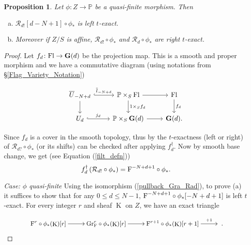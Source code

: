 \documentclass[12pt, reqno]{amsart}
\theoremstyle{plain}
\newtheorem{prop}[thm]{\bf Proposition}
\theoremstyle{definition}
\theoremstyle{definition}
\newcommand{\bbP}{{\mathbb P}}
\newcommand{\bG}{{\bf G}}
\newcommand{\cR}{{\mathcal R}}
\DeclareMathOperator{\KK}{K}
\begin{document}
\begin{prop}\label{Grass_Rad_Corollary}
    Let $\phi \colon Z \to \bbP$ be a quasi-finite morphism. Then 
    \begin{enumerate}[(a)]
        \item  $\cR_{d!}[d-N+1] \circ \phi_{*}$ is left $t$-exact.
        \item  Moreover if $Z/S$ is affine, $\cR_{d!} \circ \phi_{*}$ and $\cR_{d} \circ \phi_{*}$ are right $t$-exact.
    \end{enumerate}
\end{prop}

\begin{proof}


 Let $f_d \colon \textup{Fl} \to \bG(d)$ be the projection map. This is a smooth and proper morphism and we have a commutative diagram (using notations from \S \ref{Flag_Variety_Notation}) 

\begin{equation}\label{Grass_Rad_Corollary_diagram}
\begin{tikzcd}[row sep=normal, column sep=normal]
   \overline{U}_{-N+d} \arrow[r,hook,"\overline{l}_{-N+d}"] \arrow[d] & \bbP \times_S \textup{Fl} \arrow[d,"1\times_S f_d"] \arrow[r] & \textup{Fl} \arrow[d,"f_d"] \\
    U_{d} \arrow[r,hook,"j_{d}"] & \bbP \times_S \bG(d) \arrow[r] & \bG(d).
\end{tikzcd}
\end{equation}  

Since $f_d$ is a cover in the smooth topology, thus by \cite[Proposition 4.2.5]{BBDG18} the $t$-exactness (left or right) of $\cR_{d?}\circ \phi_{*}$ (or its shifts) can be checked after applying $f_d^{\dagger}$. Now by smooth base change, we get (see Equation (\ref{filt_defn})) 
\begin{equation}\label{pullback_Gra_Rad}
f_{d}^\dagger \left ( \cR_{d!}\circ \phi_{*} \right )=\textup{F}^{-N+d+1}\circ \phi_{*}.
\end{equation}

\textit{Case: $\phi$ quasi-finite}\newline
Using the isomorphism (\ref{pullback_Gra_Rad}), to prove (a) it suffices to show that for any $0 \leq d \leq N-1$, $\textup{F}^{-N+d+1}\circ \phi_{*}[-N+d+1]$ is left $t$-exact. For every integer $r$ and sheaf $\KK$ on $Z$, we have an exact triangle

 \[
 \small \xymatrix{\textup{F}^{r}\circ \phi_{*}(\KK) [r] \ar[r] & \textup{Gr}_\textup{F}^{r}\circ \phi_{*}(\KK) [r] \ar[r] & \textup{F}^{r+1}\circ \phi_{*}(\KK)[r+1] \ar^-{+1}[r]&}.
\]


\end{proof}
\end{document}
